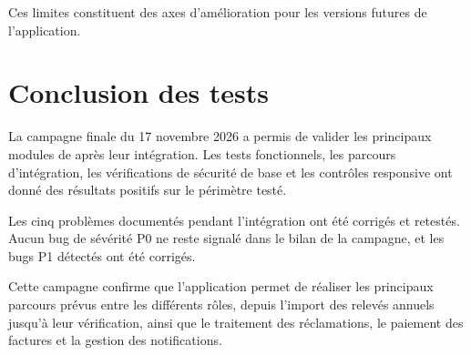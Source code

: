 Ces limites constituent des axes d'amélioration pour les versions futures de l'application.

\section{Conclusion des tests}

La campagne finale du 17 novembre 2026 a permis de valider les principaux modules de \projectname{} après leur intégration. Les tests fonctionnels, les parcours d'intégration, les vérifications de sécurité de base et les contrôles responsive ont donné des résultats positifs sur le périmètre testé.

Les cinq problèmes documentés pendant l'intégration ont été corrigés et retestés. Aucun bug de sévérité P0 ne reste signalé dans le bilan de la campagne, et les bugs P1 détectés ont été corrigés.

Cette campagne confirme que l'application permet de réaliser les principaux parcours prévus entre les différents rôles, depuis l'import des relevés annuels jusqu'à leur vérification, ainsi que le traitement des réclamations, le paiement des factures et la gestion des notifications.

